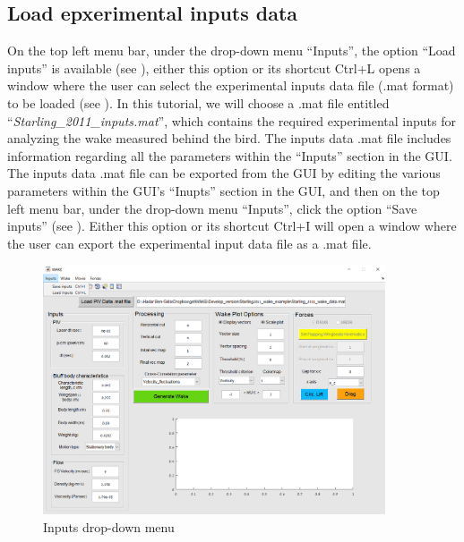 \documentclass[12pt,a4paper]{article}
\begin{document}
\subsection{Load epxerimental inputs data}
On the top left menu bar, under the drop-down menu ``Inputs'', the option ``Load inputs'' is available (see ), either this option or its shortcut Ctrl+L opens a window where the user can select the experimental inputs data file (.mat format) to be loaded (see ).
In this tutorial, we will choose a .mat file entitled ``\textit{Starling\_2011\_inputs.mat}'', which contains the required experimental inputs for analyzing the wake measured behind the bird.
The inputs data .mat file includes information regarding all the parameters within the ``Inputs'' section in the GUI.  The inputs data .mat file can be exported from the GUI by editing the various parameters within the GUI's ``Inupts'' section in the GUI, and then on the top left menu bar, under the drop-down menu ``Inputs'', click the option ``Save inputs'' (see ). 
Either this option or its shortcut Ctrl+I will open a window where the user can export the experimental input data file as a .mat file.

\newpage
\begin{figure}[ht!]
	\centering
	\includegraphics[width=0.9\textwidth]{Inputs-drop-down-menu}
	\caption{Inputs drop-down menu}
	\label{fig:GUI-Inputs-drop-down-menu}
\end{figure}
\end{document}
